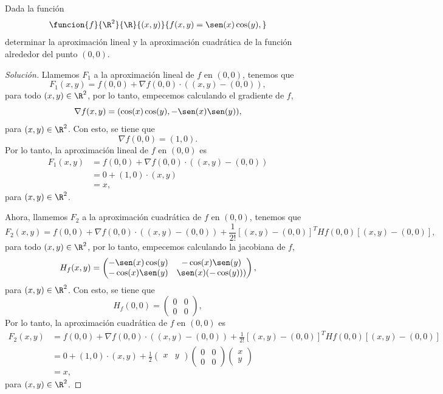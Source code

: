 \documentclass[a4,11pt]{aleph-notas}
\begin{document}
\begin{ejer}
Dada la función
    \[
        \funcion{f}{\R^2}{\R}{(x,y)}{f(x,y)=\sen(x)\cos(y),}
    \]
    determinar la aproximación lineal y la aproximación cuadrática de la función alrededor del punto $(0,0)$.
\end{ejer}

\begin{proof}[Solución]
Llamemos $F_1$ a la aproximación lineal de $f$ en $(0,0)$, tenemos que
    \[
        F_1(x,y) = f(0,0) + \nabla f(0,0) \cdot ((x,y)-(0,0)),
    \]
    para todo $(x,y)\in\R ^2$, por lo tanto, empecemos calculando el gradiente de $f$,
    \[
        \nabla f(x,y) = (\cos(x) \cos(y), -\sen(x) \sen(y) ),
    \]
    para $(x,y)\in\R^2$. Con esto, se tiene que
    \[
        \nabla f(0,0) = (1,0).
    \]
    Por lo tanto, la aproximación lineal de $f$ en $(0,0)$ es
    \begin{align*}
        F_1(x,y)
            & = f(0,0) + \nabla f(0,0) \cdot ((x,y)-(0,0))\\
            & = 0 + (1,0)\cdot (x,y)\\
            & = x,
    \end{align*}
    para $(x,y)\in\R^2$.
    
    Ahora, llamemos $F_2$ a la aproximación cuadrática de $f$ en $(0,0)$, tenemos que
    \[
        F_2(x,y) = f(0,0) + \nabla f(0,0) \cdot ((x,y)-(0,0))  + \frac{1}{2!}[(x,y)-(0,0)]^T Hf(0,0) [(x,y)-(0,0)],
    \]
    para todo $(x,y)\in\R ^2$, por lo tanto, empecemos calculando la jacobiana de $f$,
    \[
        H_f(x,y) = 
        \begin{pmatrix}
            -\sen(x)\cos(y) & -\cos(x)\sen(y)\\
            -\cos(x) \sen(y) & \sen(x) (-\cos(y)))
        \end{pmatrix},
    \]
    para $(x,y)\in\R^2$. Con esto, se tiene que
    \[
        H_f(0,0) = \begin{pmatrix}
            0 & 0\\
            0 & 0
        \end{pmatrix},
    \]
    Por lo tanto, la aproximación cuadrática de $f$ en $(0,0)$ es
    \begin{align*}
        F_2(x,y)
            & = f(0,0) + \nabla f(0,0) \cdot ((x,y)-(0,0))+ \frac{1}{2!}[(x,y)-(0,0)]^T Hf(0,0) [(x,y)-(0,0)]\\
            & = 0 + (1,0)\cdot (x,y) +
            \frac 1 2 
            \begin{pmatrix}
            x&y
            \end{pmatrix}
            \begin{pmatrix}
            0 & 0\\
            0 & 0
            \end{pmatrix}
            \begin{pmatrix}
            x\\y
            \end{pmatrix}\\
            & = x,
    \end{align*}
    para $(x,y)\in\R^2$.
\end{proof}
\end{document}
